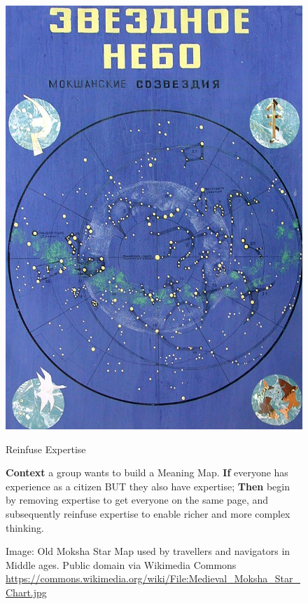 \documentclass{article}
\begin{document}

\begin{figure}[h]
\begin{adjustbox}{minipage=[c]{\textwidth-10mm},margin= 5mm 5mm 5mm 5mm, frame=1pt, bgcolor=almond,env=center}%
\begin{center}
\includegraphics[trim=0mm 0mm 0mm 65mm, clip,  width=.78\columnwidth]{star_chart.jpg}
\end{center}
\begin{center}
\begin{minipage}[t]{0.97\columnwidth}\raggedright
\medskip
{\huge Reinfuse Expertise}
\bigskip

\Large
\textbf{Context} a group wants to build a {\sc Meaning Map}.\newline
\textbf{If} everyone has experience as a citizen BUT they also have expertise;\newline
\textbf{Then} begin by removing expertise to get everyone on the same page, and subsequently reinfuse expertise to enable richer and more complex thinking.\newline\smallskip
\bigskip

\end{minipage}
\end{center}

\caption*{Image: Old Moksha Star Map used by travellers and navigators in Middle ages.  Public domain via Wikimedia
Commons\newline
\url{https://commons.wikimedia.org/wiki/File:Medieval_Moksha_Star_Chart.jpg}}
\end{adjustbox}
\end{figure}
\end{document}
